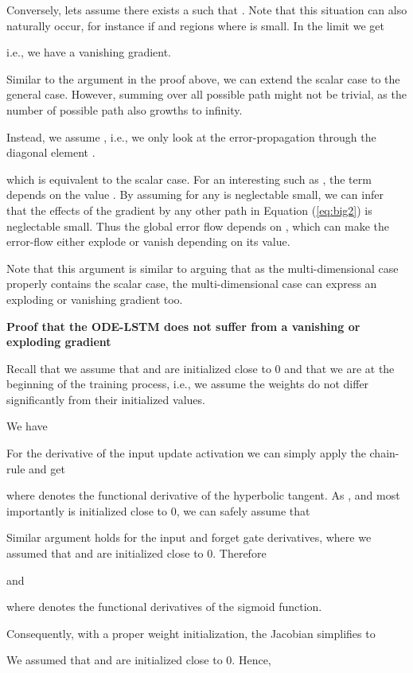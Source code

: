 \documentclass{article}
\begin{document}
Conversely, lets assume there exists a  such that  . Note that this situation can also naturally occur, for instance if  and regions where  is small.
In the limit  we get

i.e., we have a vanishing gradient.

Similar to the argument in the proof above, we can extend the scalar case to the general case.
However, summing over all possible path might not be trivial, as the number of possible path also growths to infinity.

Instead, we assume , i.e., we only look at the error-propagation through the diagonal element .

which is equivalent to the scalar case.
For an interesting  such as , the term  depends on the value .
By assuming  for any  is neglectable small, we can infer that the effects of the gradient by any other path in Equation (\ref{eq:big2}) is neglectable small. Thus the global error flow depends on , which can make the error-flow either explode or vanish depending on its value.

Note that this argument is similar to arguing that as the multi-dimensional case properly contains the scalar case, the multi-dimensional case can express an exploding or vanishing gradient too.

\textbf{Proof that the ODE-LSTM does not suffer from a vanishing or exploding gradient}


Recall that we assume that  and  are initialized close to 0 and that we are at the beginning of the training process, i.e., we assume the weights do not differ significantly from their initialized values.

We have




For the derivative of the input update activation we can simply apply the chain-rule and get

where  denotes the functional derivative of the hyperbolic tangent.
As ,   and most importantly  is initialized close to 0, we can safely assume that


Similar argument holds for the input and forget gate derivatives, where we assumed that  and  are initialized close to 0. Therefore

and

where  denotes the functional derivatives of the sigmoid function.

Consequently, with a proper weight initialization, the Jacobian simplifies to 


We assumed that  and  are initialized close to 0. Hence,
\end{document}
